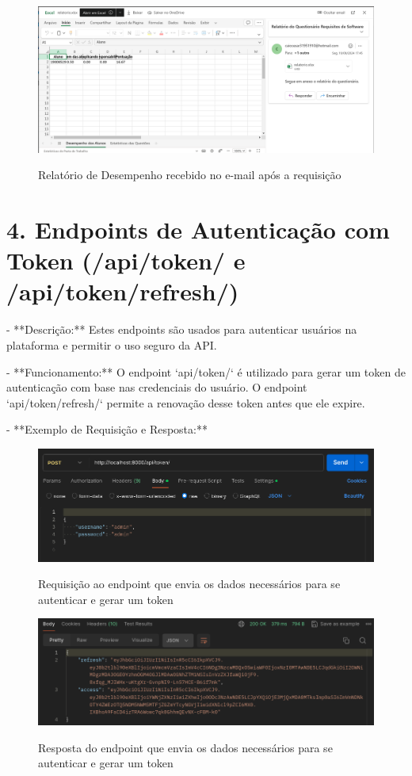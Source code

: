 \begin{figure}[H]
    \centering
    \caption{Relatório de Desempenho recebido no e-mail após a requisição}
    \includegraphics[width=1\textwidth]{figuras/report_email.png}
    \label{fig:report_questions}
\end{figure}

\section*{4. Endpoints de Autenticação com Token (/api/token/ e /api/token/refresh/)}

- **Descrição:** Estes endpoints são usados para autenticar usuários na plataforma e permitir o uso seguro da API.

- **Funcionamento:** O endpoint `api/token/` é utilizado para gerar um token de autenticação com base nas credenciais do usuário. O endpoint `api/token/refresh/` permite a renovação desse token antes que ele expire.

- **Exemplo de Requisição e Resposta:**

\begin{figure}[H]
    \centering
    \caption{Requisição ao endpoint que envia os dados necessários para se autenticar e gerar um token}
    \includegraphics[width=1\textwidth]{figuras/token.png}
    \label{fig:report_questions}
\end{figure}

\begin{figure}[H]
    \centering
    \caption{Resposta do endpoint que envia os dados necessários para se autenticar e gerar um token}
    \includegraphics[width=1\textwidth]{figuras/token_result.png}
    \label{fig:report_questions}
\end{figure}

